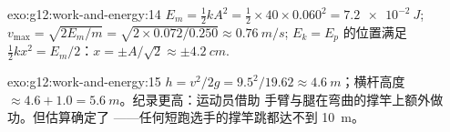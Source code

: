 \begin{solution}{exo:g12:work-and-energy:14}
$E_m = \tfrac12 kA^2 = \tfrac12 \times 40 \times 0.060^2 =
\qty{7.2e-2}{J}$; $v_{\max} = \sqrt{2E_m/m} =
\sqrt{2 \times 0.072/0.250} \approx \qty{0.76}{m/s}$;
$E_k = E_p$ 的位置满足 $\tfrac12 kx^2 = E_m/2$：$x = \pm A/\sqrt 2 \approx
\pm\qty{4.2}{cm}$.
\end{solution}

\begin{solution}{exo:g12:work-and-energy:15}
$h = v^2/2g = 9.5^2/19.62 \approx \qty{4.6}{m}$；横杆高度 $\approx
4.6 + 1.0 = \qty{5.6}{m}$。纪录更高：运动员借助
手臂与腿在弯曲的撑竿上额外做功。但估算确定了
——任何短跑选手的撑竿跳都达不到 \qty{10}{m}。
\end{solution}

